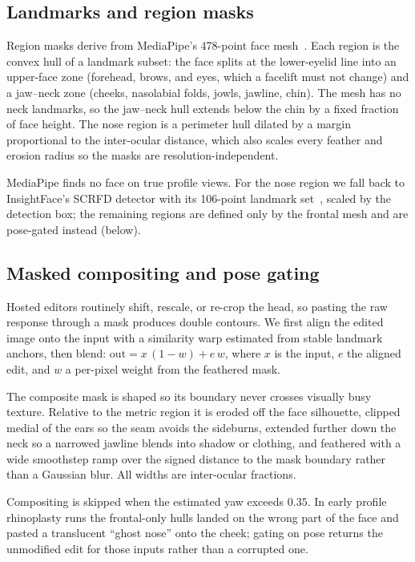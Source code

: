 \subsection{Landmarks and region masks}
\label{sec:masks}

Region masks derive from MediaPipe's 478-point face
mesh~\cite{lugaresi2019mediapipe,grishchenko2020attentionmesh}. Each region is the
convex hull of a landmark subset: the face splits at the lower-eyelid line into an
upper-face zone (forehead, brows, and eyes, which a facelift must not change) and a
jaw--neck zone (cheeks, nasolabial folds, jowls, jawline, chin). The mesh has no
neck landmarks, so the jaw--neck hull extends below the chin by a fixed fraction of
face height. The nose region is a perimeter hull dilated by a margin proportional
to the inter-ocular distance, which also scales every feather and erosion radius so
the masks are resolution-independent.

MediaPipe finds no face on true profile views. For the nose region we fall back to
InsightFace's SCRFD detector with its 106-point landmark
set~\cite{guo2022scrfd}, scaled by the detection box; the remaining regions are
defined only by the frontal mesh and are pose-gated instead (below).

\subsection{Masked compositing and pose gating}
\label{sec:composite}

Hosted editors routinely shift, rescale, or re-crop the head, so pasting the raw
response through a mask produces double contours. We first align the edited image
onto the input with a similarity warp estimated from stable landmark anchors, then
blend: $\mathrm{out} = x\,(1-w) + e\,w$, where $x$ is the input, $e$ the aligned
edit, and $w$ a per-pixel weight from the feathered mask.

The composite mask is shaped so its boundary never crosses visually busy texture.
Relative to the metric region it is eroded off the face silhouette, clipped medial
of the ears so the seam avoids the sideburns, extended further down the neck so a
narrowed jawline blends into shadow or clothing, and feathered with a wide
smoothstep ramp over the signed distance to the mask boundary rather than a
Gaussian blur. All widths are inter-ocular fractions.

Compositing is skipped when the estimated yaw exceeds $0.35$. In early profile
rhinoplasty runs the frontal-only hulls landed on the wrong part of the face and
pasted a translucent ``ghost nose'' onto the cheek; gating on pose returns the
unmodified edit for those inputs rather than a corrupted one.

